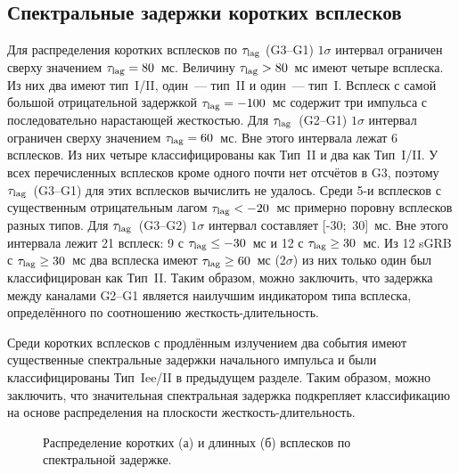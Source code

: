 \subsection{Спектральные задержки коротких всплесков}
Для распределения коротких всплесков по $\tau_{\mathrm{lag}}$ (G3--G1) $1\sigma$ 
интервал ограничен сверху значением $\tau_{\mathrm{lag}}=80$~мс.     
Величину $\tau_{\mathrm{lag}} > 80$~мс  имеют четыре всплеска. 
Из них два имеют тип~I/II, один~--- тип~II и один~--- тип~I. 
Всплеск с самой большой отрицательной задержкой $\tau_{\mathrm{lag}}=-100$~мс содержит три 
импульса с последовательно нарастающей жесткостью. 
Для $\tau_{\mathrm{lag}}$~(G2--G1) $1\sigma$ интервал ограничен сверху значением 
$\tau_{{\mathrm{lag}}}=60$~мс. Вне этого интервала лежат 6 всплесков. 
Из них четыре классифицированы как Тип~II и два как Тип~I/II. 
У всех перечисленных всплесков кроме одного почти нет отсчётов в G3, поэтому 
$\tau_{{\mathrm{lag}}}$~(G3--G1) для этих всплесков вычислить не удалось. 
Среди 5-и всплесков с существенным отрицательным лагом 
$\tau_{{\mathrm{lag}}} <-20$~мс примерно поровну всплесков разных типов.
Для $\tau_{\mathrm{lag}}$~(G3--G2) $1\sigma$ интервал составляет [-30;~30]~мс. 
Вне этого интервала лежит 21 всплеск: 9 с $\tau_{\mathrm{lag}} \leq -30$~мс и 
12 с $\tau_{\mathrm{lag}} \geq 30$~мс. 
Из 12 sGRB с $\tau_{\mathrm{lag}}\geq 30$~мс два всплеска имеют  $\tau_{\mathrm{lag}} \geq 60$~мс ($2\sigma$) 
из них только один был классифицирован как Тип~II. 
Таким образом, можно заключить, что задержка между каналами G2--G1 является наилучшим 
индикатором типа всплеска, определённого по соотношению жесткость-длительность.

Среди коротких всплесков с продлённым излучением два события имеют существенные  %
спектральные задержки начального импульса и были классифицированы Тип~Iee/II в предыдущем разделе. Таким образом, 
можно заключить, что значительная спектральная задержка подкрепляет классификацию 
на основе распределения на плоскости жесткость-длительность.



\begin{figure}[h]
  \begin{minipage}[h]{0.5\textwidth}
  \end{minipage}
  \hfill
  \begin{minipage}[h]{0.5\textwidth}
  \end{minipage}
  \caption{Распределение коротких (а) и длинных (б) всплесков по спектральной задержке.}
  \label{img:LagDistrs}  
\end{figure}

